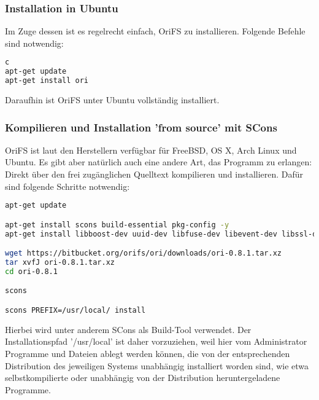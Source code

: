 \subsubsection{Installation in Ubuntu}
\label{subsubsec:Installation in Ubuntu}
Im Zuge dessen ist es regelrecht einfach, OriFS zu installieren. Folgende Befehle sind notwendig:
\begin{lstlisting}[frame=single, language=bash, caption=Anleitung zur Installation]c
apt-get update
apt-get install ori
\end{lstlisting}
Daraufhin ist OriFS unter Ubuntu vollständig installiert.

\subsubsection{Kompilieren und Installation 'from source' mit SCons}
\label{subsubsec:Kompilieren und Installation 'from source' mit SCons}
OriFS ist laut den Herstellern verfügbar für FreeBSD, OS X, Arch Linux und Ubuntu.
Es gibt aber natürlich auch eine andere Art, das Programm zu erlangen: Direkt über den frei zugänglichen Quelltext kompilieren und installieren. Dafür sind folgende Schritte notwendig:
\begin{lstlisting}[frame=single, language=bash, caption=Anleitung zur Installation 'from source']
apt-get update

apt-get install scons build-essential pkg-config -y
apt-get install libboost-dev uuid-dev libfuse-dev libevent-dev libssl-dev -y

wget https://bitbucket.org/orifs/ori/downloads/ori-0.8.1.tar.xz
tar xvfJ ori-0.8.1.tar.xz
cd ori-0.8.1

scons

scons PREFIX=/usr/local/ install
\end{lstlisting}
Hierbei wird unter anderem SCons als Build-Tool verwendet. Der Installationspfad '/usr/local' ist daher vorzuziehen, weil hier vom Administrator Programme und Dateien ablegt werden können, die von der entsprechenden Distribution des jeweiligen Systems unabhängig installiert worden sind, wie etwa selbstkompilierte oder unabhängig von der Distribution heruntergeladene Programme. 

